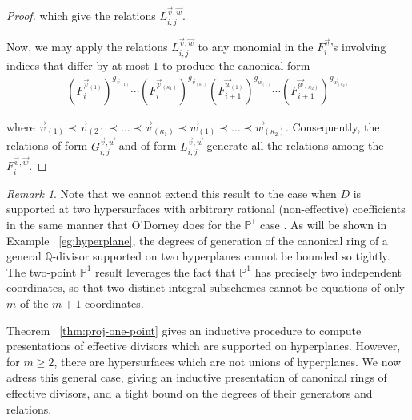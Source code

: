 \documentclass{amsart}
\theoremstyle{plain}
\theoremstyle{definition}
\theoremstyle{remark}
\newtheorem{rem}[thm]{Remark}
\numberwithin{equation}{section}
\newcommand\bq{{\mathbb Q}}
\newcommand\bp{{\mathbb P}}
\begin{document}
\begin{proof}
\noindent 
which give the relations $L_{i, j}^{\vec{v}, \vec{w}}$.

Now, we may apply the relations $L_{i, j}^{\vec{v}, \vec{w}}$
to any monomial in the $F_i^{\vec{v}}$'s involving
indices that differ by at most $1$ to produce the canonical form
\begin{align*}
	(F_i^{\vec{v}_{(1)}})^{g_{\vec{v}_{(1)}}} \cdots
	(F_i^{\vec{v}_{(\kappa_1)}})^{g_{\vec{v}_{(\kappa_1)}}}
	(F_{i + 1}^{\vec{w}_{(1)}})^{g_{\vec{w}_{(1)}}} \cdots
	(F_{i + 1}^{\vec{w}_{(\kappa_2)}})^{g_{\vec{w}_{(\kappa_2)}}}
\end{align*}

\noindent
where $\vec{v}_{(1)} \prec \vec{v}_{(2)} \prec \ldots \prec
\vec{v}_{(\kappa_1)} \prec \vec{w}_{(1)} \prec \ldots \prec
\vec{w}_{(\kappa_2)}$. Consequently, the relations of form
$G_{i, j}^{\vec{v}, \vec{w}}$ and of form $L_{i, j}^{\vec{v},
\vec{w}}$ generate all the relations among the $F_{i}^{\vec{v},
\vec{w}}$.
\end{proof}

\begin{rem}
\label{rem:proj-two-points}
Note that we cannot extend this result to the case when
$D$ is supported at two hypersurfaces with arbitrary rational (non-effective)
coefficients in the same manner that O'Dorney does for the
$\bp^1$ case \cite[Section 4]{dorney:canonical}. As will be shown
in Example ~\ref{eg:hyperplane}, the degrees of generation of the
canonical ring of a general $\bq$-divisor supported on two
hyperplanes cannot be bounded so tightly. The two-point
$\bp^1$ result leverages the fact that $\bp^1$ has precisely two
independent coordinates, so that two distinct integral subschemes
cannot be equations of only $m$ of the $m+1$ coordinates.
\end{rem}


Theorem ~\ref{thm:proj-one-point} gives an inductive procedure to
compute presentations of effective divisors which are supported on
hyperplanes. However, for $m \geq 2$, there are hypersurfaces which
are not unions of hyperplanes. We now adress this general case, giving an inductive presentation of canonical rings of effective divisors, and a tight bound on the degrees of their generators and
relations.
\end{document}
